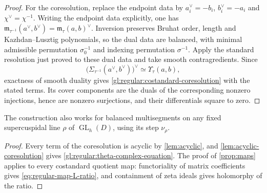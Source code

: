 \documentclass[10pt,a4paper]{article}
\newtheorem{prop}[theorem]{Proposition}
\theoremstyle{definition}
\theoremstyle{remark}
\numberwithin{equation}{section}
\newcommand{\Ff}{F}
\newcommand{\fm}{\mathfrak{m}}
\newcommand{\Lrep}{\mathrm{L}}
\newcommand{\cZ}{\mathcal{Z}}
\newcommand{\cE}{\mathcal{E}}
\DeclareMathOperator{\GL}{GL}
\begin{document}
\begin{proof}
For the coresolution, replace the endpoint data by
$a_i^\vee=-b_i$, $b_i^\vee=-a_i$ and $\chi^\vee=\chi^{-1}$.
Writing the endpoint data explicitly, one has
$\fm_{\tau^{-1}}(a^\vee,b^\vee)=\fm_\tau(a,b)^\vee$.
Inversion preserves Bruhat order, length and Kazhdan--Lusztig
polynomials, so the dual data are balanced, with minimal admissible
permutation $\sigma_0^{-1}$ and indexing permutation $\sigma^{-1}$.
Apply the standard resolution just proved to these dual data and
take smooth contragredients. Since
\[
 \bigl(\Sigma_{\tau^{-1}}(a^\vee,b^\vee)\bigr)^\vee
 \simeq\Upsilon_\tau(a,b),
\]
exactness of smooth duality gives
\eqref{gl:regular:costandard-coresolution} with the stated terms.
Its cover components are the duals of the corresponding nonzero
injections, hence are nonzero surjections, and their differentials
square to zero.
\end{proof}

The construction also works for balanced multisegments on any fixed supercuspidal line
$\rho$ of $\GL_h(D)$, using its step $\nu_\rho$.

\begin{proof}
Every term of the coresolution is acyclic by \cref{lem:acyclic}, and
\cref{lem:acyclic-coresolution} gives
\eqref{gl:regular:theta-complex-equation}. The proof of
\cref{prop:maps} applies to every costandard quotient map:
functoriality of matrix coefficients gives
\eqref{eq:regular-map-L-ratio}, and containment of zeta ideals
gives holomorphy of the ratio.
\end{proof}
\end{document}
